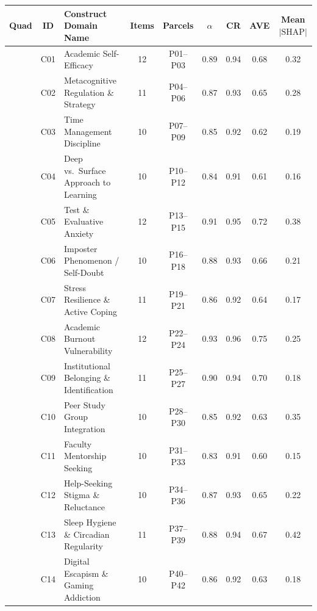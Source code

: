 \documentclass[10pt,a4paper]{article}
\begin{document}
\begin{table}[h!]
\centering
\small
\renewcommand{\arraystretch}{1.15}
\begin{tabularx}{\textwidth}{cc>{\raggedright\arraybackslash}Xcccccc}
\toprule
\textbf{Quad} & \textbf{ID} & \textbf{Construct Domain Name} & \textbf{Items} & \textbf{Parcels} & \textbf{$\alpha$} & \textbf{CR} & \textbf{AVE} & \textbf{Mean $|\text{SHAP}|$} \\
\midrule
\rowcolor{BlueLight} & C01 & Academic Self-Efficacy & 12 & P01--P03 & 0.89 & 0.94 & 0.68 & 0.32 \\
\rowcolor{BlueLight} & C02 & Metacognitive Regulation \& Strategy & 11 & P04--P06 & 0.87 & 0.93 & 0.65 & 0.28 \\
\rowcolor{BlueLight} \multirow{-3}{*}{\textbf{Q1}} & C03 & Time Management Discipline & 10 & P07--P09 & 0.85 & 0.92 & 0.62 & 0.19 \\
\rowcolor{BlueLight} & C04 & Deep vs.\ Surface Approach to Learning & 10 & P10--P12 & 0.84 & 0.91 & 0.61 & 0.16 \\
\midrule
\rowcolor{RedLight} & C05 & Test \& Evaluative Anxiety & 12 & P13--P15 & 0.91 & 0.95 & 0.72 & 0.38 \\
\rowcolor{RedLight} & C06 & Imposter Phenomenon / Self-Doubt & 10 & P16--P18 & 0.88 & 0.93 & 0.66 & 0.21 \\
\rowcolor{RedLight} \multirow{-3}{*}{\textbf{Q2}} & C07 & Stress Resilience \& Active Coping & 11 & P19--P21 & 0.86 & 0.92 & 0.64 & 0.17 \\
\rowcolor{RedLight} & C08 & Academic Burnout Vulnerability & 12 & P22--P24 & 0.93 & 0.96 & 0.75 & 0.25 \\
\midrule
\rowcolor{CanvasBG} & C09 & Institutional Belonging \& Identification & 11 & P25--P27 & 0.90 & 0.94 & 0.70 & 0.18 \\
\rowcolor{CanvasBG} & C10 & Peer Study Group Integration & 10 & P28--P30 & 0.85 & 0.92 & 0.63 & 0.35 \\
\rowcolor{CanvasBG} \multirow{-3}{*}{\textbf{Q3}} & C11 & Faculty Mentorship Seeking & 10 & P31--P33 & 0.83 & 0.91 & 0.60 & 0.15 \\
\rowcolor{CanvasBG} & C12 & Help-Seeking Stigma \& Reluctance & 10 & P34--P36 & 0.87 & 0.93 & 0.65 & 0.22 \\
\midrule
\rowcolor{GoldBG} & C13 & Sleep Hygiene \& Circadian Regularity & 11 & P37--P39 & 0.88 & 0.94 & 0.67 & 0.42 \\
\rowcolor{GoldBG} & C14 & Digital Escapism \& Gaming Addiction & 10 & P40--P42 & 0.86 & 0.92 & 0.63 & 0.18 \\

\end{tabularx}
\end{table}
\end{document}
